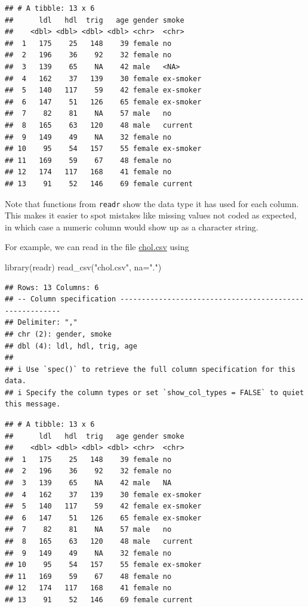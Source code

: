\documentclass[
]{book}
\newenvironment{Shaded}{\begin{snugshade}}{\end{snugshade}}
\newcommand{\AttributeTok}[1]{\textcolor[rgb]{0.77,0.63,0.00}{#1}}
\newcommand{\FunctionTok}[1]{\textcolor[rgb]{0.00,0.00,0.00}{#1}}
\newcommand{\NormalTok}[1]{#1}
\newcommand{\StringTok}[1]{\textcolor[rgb]{0.31,0.60,0.02}{#1}}
\begin{document}
\begin{verbatim}
## # A tibble: 13 x 6
##      ldl   hdl  trig   age gender smoke    
##    <dbl> <dbl> <dbl> <dbl> <chr>  <chr>    
##  1   175    25   148    39 female no       
##  2   196    36    92    32 female no       
##  3   139    65    NA    42 male   <NA>     
##  4   162    37   139    30 female ex-smoker
##  5   140   117    59    42 female ex-smoker
##  6   147    51   126    65 female ex-smoker
##  7    82    81    NA    57 male   no       
##  8   165    63   120    48 male   current  
##  9   149    49    NA    32 female no       
## 10    95    54   157    55 female ex-smoker
## 11   169    59    67    48 female no       
## 12   174   117   168    41 female no       
## 13    91    52   146    69 female current
\end{verbatim}

Note that functions from \texttt{readr} show the data type it has used for each column. This makes it easier to spot mistakes like missing values not coded as expected, in which case a numeric column would show up as a character string.

For example, we can read in the file \href{https://github.com/UofGAnalyticsData/R/raw/main/Week\%203/chol.csv}{chol.csv} using

\begin{Shaded}
\begin{Highlighting}[]
\FunctionTok{library}\NormalTok{(readr)}
\FunctionTok{read\_csv}\NormalTok{(}\StringTok{"chol.csv"}\NormalTok{, }\AttributeTok{na=}\StringTok{"."}\NormalTok{)}
\end{Highlighting}
\end{Shaded}

\begin{verbatim}
## Rows: 13 Columns: 6
## -- Column specification --------------------------------------------------------
## Delimiter: ","
## chr (2): gender, smoke
## dbl (4): ldl, hdl, trig, age
## 
## i Use `spec()` to retrieve the full column specification for this data.
## i Specify the column types or set `show_col_types = FALSE` to quiet this message.
\end{verbatim}

\begin{verbatim}
## # A tibble: 13 x 6
##      ldl   hdl  trig   age gender smoke    
##    <dbl> <dbl> <dbl> <dbl> <chr>  <chr>    
##  1   175    25   148    39 female no       
##  2   196    36    92    32 female no       
##  3   139    65    NA    42 male   NA       
##  4   162    37   139    30 female ex-smoker
##  5   140   117    59    42 female ex-smoker
##  6   147    51   126    65 female ex-smoker
##  7    82    81    NA    57 male   no       
##  8   165    63   120    48 male   current  
##  9   149    49    NA    32 female no       
## 10    95    54   157    55 female ex-smoker
## 11   169    59    67    48 female no       
## 12   174   117   168    41 female no       
## 13    91    52   146    69 female current
\end{verbatim}
\end{document}
